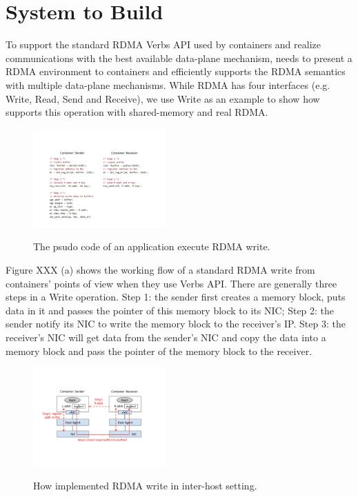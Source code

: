 \section{System to Build} \label{sec:promise}

To support the standard RDMA Verbs API used by containers and realize
communications with the best available data-plane mechanism, \sysname needs
to present a RDMA environment to containers and efficiently supports 
the RDMA semantics with multiple data-plane mechanisms. While RDMA has
four interfaces (e.g. Write, Read, Send and Receive), we use Write as an example
to show how \sysname supports this operation with shared-memory and real RDMA.

     \begin{figure}[ht]
     \centering 
     \includegraphics[width=0.45\textwidth]{figures/system/sys_rdma_code.pdf}      
     \label{fig:sys_rdma_code}
     \caption{The psudo code of an application execute RDMA write.} 
     \end{figure}

Figure XXX (a) shows the working flow of a standard RDMA write from containers'
points of view when they use Verbs API. There are generally three steps in a 
Write operation. 
Step 1: the sender first creates a memory block, puts data in it and passes 
the pointer of this memory block to its NIC;
Step 2: the sender notify its NIC to write the memory block to the receiver's IP.
Step 3: the receiver's NIC will get data from the sender's NIC and copy the 
data into a memory block and pass the pointer of the memory block to the 
receiver.

     \begin{figure}[ht]
     \centering 
     \includegraphics[width=0.45\textwidth]{figures/system/sys_rdma_rdma.pdf}      
     \label{fig:sys_rdma_rdma}
     \caption{How \sysname implemented RDMA write in inter-host setting.} 
     \end{figure}

